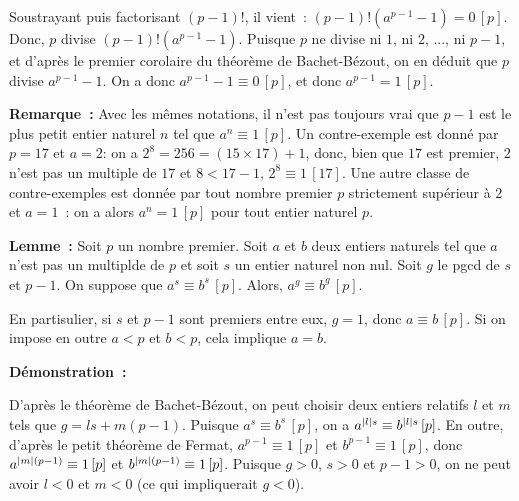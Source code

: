 Soustrayant puis factorisant $(p-1)!$, il vient : $(p-1)! \left( a^{p-1} - 1 \right) = 0 \, [p]$. 
Donc, $p$ divise $(p-1)! \left( a^{p-1} - 1 \right)$. 
Puisque $p$ ne divise ni $1$, ni $2$, ..., ni $p-1$, et d'après le premier corolaire du théorème de Bachet-Bézout, on en déduit que $p$ divise $a^{p-1} - 1$. 
On a donc $a^{p-1} - 1 \equiv 0 \, [p]$, et donc $a^{p-1} = 1 \, [p]$.

\done

\medskip

\noindent\textbf{Remarque :} Avec les mêmes notations, il n'est pas toujours vrai que $p-1$ est le plus petit entier naturel $n$ tel que $a^n \equiv 1 \, [p]$.
    Un contre-exemple est donné par $p = 17$ et $a = 2$: on a $2^8 = 256 = (15 \times 17) + 1$, donc, bien que $17$ est premier, $2$ n'est pas un multiple de $17$ et $8 < 17 - 1$, $2^8 \equiv 1 \, [17]$. 
    Une autre classe de contre-exemples est donnée par tout nombre premier $p$ strictement supérieur à $2$ et $a = 1$ : on a alors $a^n = 1 \, [p]$ pour tout entier naturel $p$.

\medskip

\noindent\textbf{Lemme :} Soit $p$ un nombre premier. 
    Soit $a$ et $b$ deux entiers naturels tel que $a$ n'est pas un multiplde de $p$ et soit $s$ un entier naturel non nul.
    Soit $g$ le pgcd de $s$ et $p-1$.
    On suppose que $a^s \equiv b^s \, [p]$.
    Alors, $a^g \equiv b^g \, [p]$.

    En partisulier, si $s$ et $p-1$ sont premiers entre eux, $g = 1$, donc $a \equiv b \, [p]$.
    Si on impose en outre $a < p$ et $b < p$, cela implique $a = b$.

\medskip

\noindent\textbf{Démonstration :} 

D'après le théorème de Bachet-Bézout, on peut choisir deux entiers relatifs $l$ et $m$ tels que $g = l s + m (p-1)$. 
Puisque $a^s \equiv b^s \, [p]$, on a $a^{\left\lvert l \right\rvert s} \equiv b^{\left\lvert l \right\rvert s} \, [p]$.
En outre, d'après le petit théorème de Fermat, $a^{p-1} \equiv 1 \, [p]$ et $b^{p-1} \equiv 1 \, [p]$, donc $a^{\left\lvert m \right\rvert (p-1)} \equiv 1 \, [p]$ et $b^{\left\lvert m \right\rvert (p-1)} \equiv 1 \, [p]$.
Puisque $g > 0$, $s > 0$ et $p-1 > 0$, on ne peut avoir $l < 0$ et $m < 0$ (ce qui impliquerait $g < 0$).

